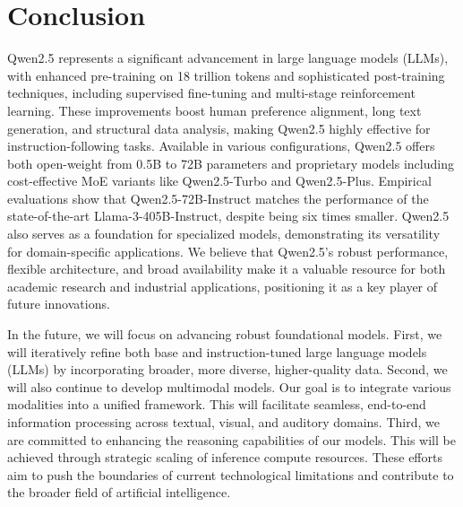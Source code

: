 
\section{Conclusion}
\label{sec:conclusion}


Qwen2.5 represents a significant advancement in large language models (LLMs), with enhanced pre-training on 18 trillion tokens and sophisticated post-training techniques, including supervised fine-tuning and multi-stage reinforcement learning. These improvements boost human preference alignment, long text generation, and structural data analysis, making Qwen2.5 highly effective for instruction-following tasks.
Available in various configurations, Qwen2.5 offers both open-weight from 0.5B to 72B parameters and proprietary models including cost-effective MoE variants like Qwen2.5-Turbo and Qwen2.5-Plus. Empirical evaluations show that Qwen2.5-72B-Instruct matches the performance of the state-of-the-art Llama-3-405B-Instruct, despite being six times smaller. Qwen2.5 also serves as a foundation for specialized models, demonstrating its versatility for domain-specific applications.
We believe that Qwen2.5's robust performance, flexible architecture, and broad availability make it a valuable resource for both academic research and industrial applications, positioning it as a key player of future innovations.


In the future, we will focus on advancing robust foundational models. 
First, we will iteratively refine both base and instruction-tuned large language models (LLMs) by incorporating broader, more diverse, higher-quality data.
Second, we will also continue to develop multimodal models. Our goal is to integrate various modalities into a unified framework. This will facilitate seamless, end-to-end information processing across textual, visual, and auditory domains.
Third, we are committed to enhancing the reasoning capabilities of our models. This will be achieved through strategic scaling of inference compute resources. 
These efforts aim to push the boundaries of current technological limitations and contribute to the broader field of artificial intelligence.
